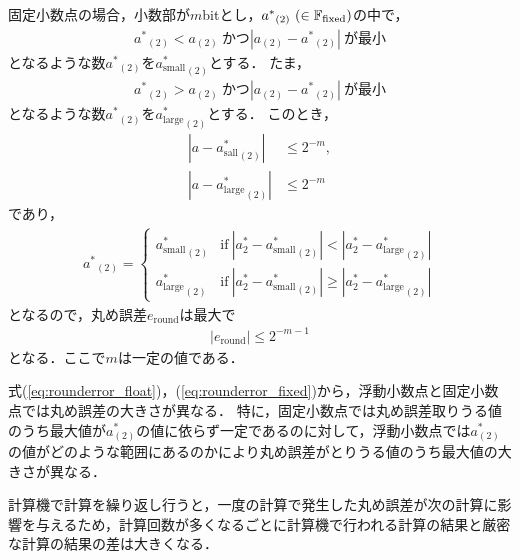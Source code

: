 固定小数点の場合，小数部が$m$bitとし，${a^{\ast}}_{(2)} \ (\in\mathbb{F}_{\text{fixed}})$の中で，
\begin{align}
    {a^{\ast}}_{(2)} < a_{(2)}\ \text{かつ} |a_{(2)} - {a^{\ast}}_{(2)}| \ \text{が最小}
\end{align}
となるような数${a^{\ast}}_{(2)}$を${a^{\ast}_{\mathrm{small}}}_{(2)}$とする．
たま，
\begin{align}
    {a^{\ast}}_{(2)} > a_{(2)} \ \text{かつ} |a_{(2)} - {a^{\ast}}_{(2)}| \ \text{が最小}
\end{align}
となるような数${a^{\ast}}_{(2)}$を${a^{\ast}_{\mathrm{large}}}_{(2)}$とする．
このとき，
\begin{align}
    |a - {a^{\ast}_{\mathrm{sall}}}_{(2)}| &\leq 2^{-m}, \\
    |a - {a^{\ast}_{\mathrm{large}}}_{(2)}| &\leq 2^{-m}
\end{align}
であり，
\begin{align}
    {a^{\ast}}_{(2)} = \left\{ 
        \begin{array}{ll}
            {a^{\ast}_{\mathrm{small}}}_{(2)} &\text{if} \ |a^{\ast}_{2} - {a^{\ast}_{\mathrm{small}}}_{(2)} | < |a^{\ast}_{2} - {a^{\ast}_{\mathrm{large}}}_{(2)} | \\
            {a^{\ast}_{\mathrm{large}}}_{(2)} &\text{if} \ |a^{\ast}_{2} - {a^{\ast}_{\mathrm{small}}}_{(2)} | \geq |a^{\ast}_{2} - {a^{\ast}_{\mathrm{large}}}_{(2)} | 
        \end{array}
    \right.
\end{align}
となるので，丸め誤差$e_{\mathrm{round}}$は最大で
\begin{align}
    \label{eq:rounderror_fixed}
    |e_{\mathrm{round}}| \leq 2^{-m-1}
\end{align}
となる．ここで$m$は一定の値である．


式(\ref{eq:rounderror_float})，(\ref{eq:rounderror_fixed})から，浮動小数点と固定小数点では丸め誤差の大きさが異なる．
特に，固定小数点では丸め誤差取りうる値のうち最大値が$a^{\ast}_{(2)}$の値に依らず一定であるのに対して，浮動小数点では$a^{\ast}_{(2)}$の値がどのような範囲にあるのかにより丸め誤差がとりうる値のうち最大値の大きさが異なる．


計算機で計算を繰り返し行うと，一度の計算で発生した丸め誤差が次の計算に影響を与えるため，計算回数が多くなるごとに計算機で行われる計算の結果と厳密な計算の結果の差は大きくなる．

